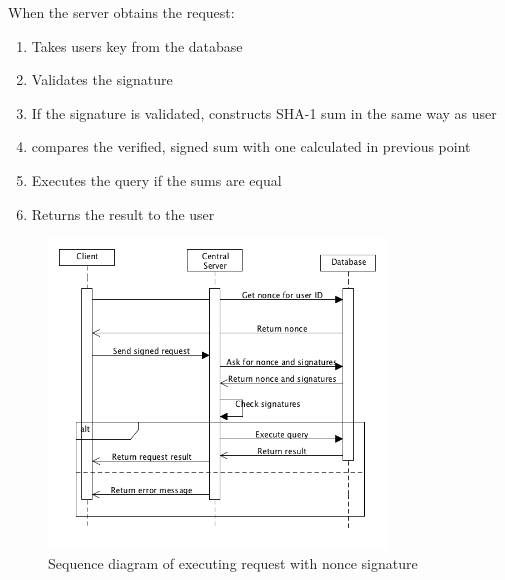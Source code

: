 When the server obtains the request:

\begin{enumerate}
\item Takes users key from the database
\item Validates the signature
\item If the signature is validated, constructs SHA-1 sum in the same way as user
\item compares the verified, signed sum with one calculated in previous point
\item Executes the query if the sums are equal
\item Returns the result to the user
\end{enumerate} 

\clearpage
\begin{figure}[h]
\centering
\includegraphics[width=0.8\textwidth]{database/nonce.png}
\caption{Sequence diagram of executing request with nonce signature}
\end{figure} 
